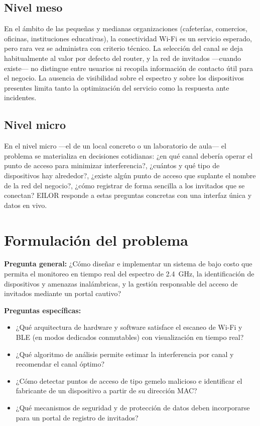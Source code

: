 \subsection{Nivel meso}
En el ámbito de las pequeñas y medianas organizaciones (cafeterías, comercios, oficinas, instituciones educativas), la conectividad Wi\nobreakdash-Fi es un servicio esperado, pero rara vez se administra con criterio técnico. La selección del canal se deja habitualmente al valor por defecto del router, y la red de invitados ---cuando existe--- no distingue entre usuarios ni recopila información de contacto útil para el negocio. La ausencia de visibilidad sobre el espectro y sobre los dispositivos presentes limita tanto la optimización del servicio como la respuesta ante incidentes.

\subsection{Nivel micro}
En el nivel micro ---el de un local concreto o un laboratorio de aula--- el problema se materializa en decisiones cotidianas: ¿en qué canal debería operar el punto de acceso para minimizar interferencia?, ¿cuántos y qué tipo de dispositivos hay alrededor?, ¿existe algún punto de acceso que suplante el nombre de la red del negocio?, ¿cómo registrar de forma sencilla a los invitados que se conectan? EILOR responde a estas preguntas concretas con una interfaz única y datos en vivo.

\section{Formulación del problema}
\textbf{Pregunta general:} ¿Cómo diseñar e implementar un sistema de bajo costo que permita el monitoreo en tiempo real del espectro de 2.4~GHz, la identificación de dispositivos y amenazas inalámbricas, y la gestión responsable del acceso de invitados mediante un portal cautivo?

\noindent\textbf{Preguntas específicas:}
\begin{itemize}[leftmargin=1.4em]
  \item ¿Qué arquitectura de hardware y software satisface el escaneo de Wi\nobreakdash-Fi y BLE (en modos dedicados conmutables) con visualización en tiempo real?
  \item ¿Qué algoritmo de análisis permite estimar la interferencia por canal y recomendar el canal óptimo?
  \item ¿Cómo detectar puntos de acceso de tipo gemelo malicioso e identificar el fabricante de un dispositivo a partir de su dirección MAC?
  \item ¿Qué mecanismos de seguridad y de protección de datos deben incorporarse para un portal de registro de invitados?
\end{itemize}

